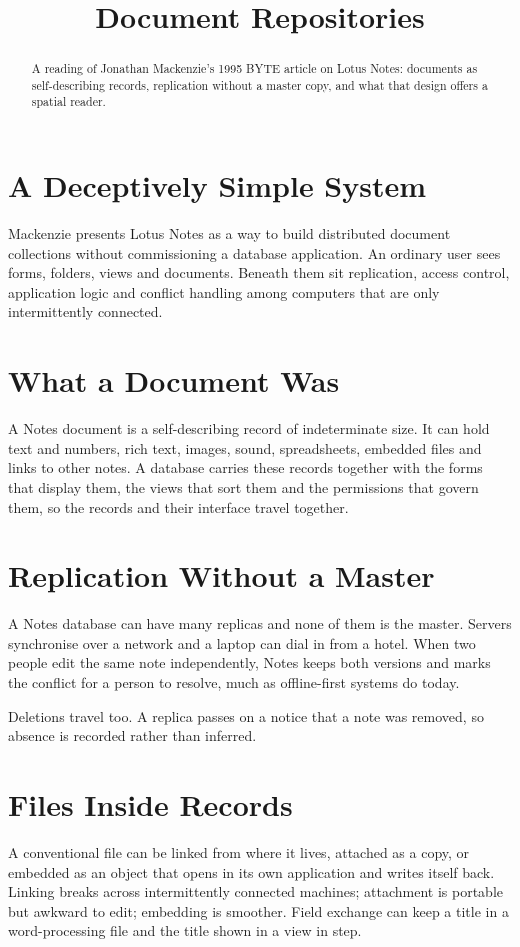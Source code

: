 \documentclass{article}
\title{Document Repositories}
\begin{document}
\begin{abstract}
A reading of Jonathan Mackenzie's 1995 BYTE article on Lotus Notes: documents as self-describing records, replication without a master copy, and what that design offers a spatial reader.
\end{abstract}
\section{A Deceptively Simple System}\label{sec:notes-intro}
Mackenzie presents Lotus Notes as a way to build distributed document collections without commissioning a database application. An ordinary user sees forms, folders, views and documents. Beneath them sit replication, access control, application logic and conflict handling among computers that are only intermittently connected.
\section{What a Document Was}\label{sec:notes-record}
A Notes document is a self-describing record of indeterminate size. It can hold text and numbers, rich text, images, sound, spreadsheets, embedded files and links to other notes. A database carries these records together with the forms that display them, the views that sort them and the permissions that govern them, so the records and their interface travel together.
\section{Replication Without a Master}\label{sec:notes-replication}
A Notes database can have many replicas and none of them is the master. Servers synchronise over a network and a laptop can dial in from a hotel. When two people edit the same note independently, Notes keeps both versions and marks the conflict for a person to resolve, much as offline-first systems do today.

Deletions travel too. A replica passes on a notice that a note was removed, so absence is recorded rather than inferred.
\section{Files Inside Records}\label{sec:notes-files}
A conventional file can be linked from where it lives, attached as a copy, or embedded as an object that opens in its own application and writes itself back. Linking breaks across intermittently connected machines; attachment is portable but awkward to edit; embedding is smoother. Field exchange can keep a title in a word-processing file and the title shown in a view in step.
\end{document}
